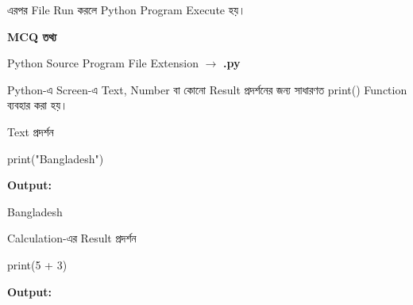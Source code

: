 এরপর File Run করলে Python Program Execute হয়।

\begin{rememberbox}

\textbf{\color{deepOrange}MCQ তথ্য}

Python Source Program File Extension
\(\longrightarrow\)
\textbf{\textenglish{\ttfamily .py}}

\end{rememberbox}



Python-এ Screen-এ Text, Number বা কোনো Result প্রদর্শনের জন্য
সাধারণত
\textenglish{\ttfamily print()}
Function ব্যবহার করা হয়।

\begin{examplebox}{Text প্রদর্শন}

\begin{codebox}

\begin{english}
\ttfamily
print("Bangladesh")
\end{english}

\end{codebox}

\textbf{Output:}

\begin{codebox}

\begin{english}
\ttfamily
Bangladesh
\end{english}

\end{codebox}

\end{examplebox}

\begin{examplebox}{Calculation-এর Result প্রদর্শন}

\begin{codebox}

\begin{english}
\ttfamily
print(5 + 3)
\end{english}

\end{codebox}

\textbf{Output:}

\begin{codebox}

\begin{english}
\end{english}

\end{codebox}

\end{examplebox}

